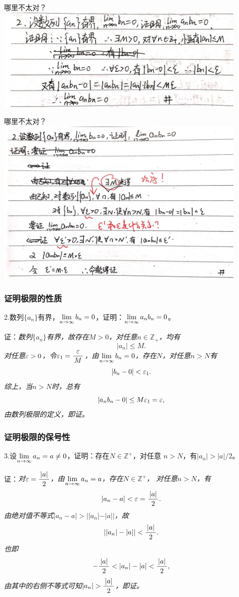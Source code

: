 \begin{frame}{哪里不太对？}
	\centering
	\includegraphics[width=0.9\textwidth]{./images/ch01/HWR/anbn0-3.jpeg}
\end{frame}

\begin{frame}{哪里不太对？}
	\centering
	\includegraphics[width=0.9\textwidth]{./images/ch01/HWR/anbn0-4.jpeg}
\end{frame}

\begin{frame}[t]\frametitle{证明极限的性质}
\large
2.数列$\{a_n\}$有界，$\lim\limits_{n\to\infty} b_n=0$，证明：$\lim\limits_{n\to\infty} a_nb_n=0$。

证：\it 数列$\{a_n\}$有界，故存在$M>0$，对任意$n\in\mathbb{Z}_+$，均有
$$|a_n|\leq M.$$
对任意$\varepsilon>0$，令$\varepsilon_1=\displaystyle\frac{\,{\varepsilon}\,}{\,{M}\,}$，由$\lim\limits_{n\to\infty} b_n=0$，存在$N$，对任意$n>N$有
$$|b_n-0|<\varepsilon_1.$$
综上，当$n>N$时，总有
$$|a_nb_n-0|\leq M\varepsilon_1=\varepsilon,$$
由数列极限的定义，即证。\fin
\end{frame}

\begin{frame}[t]\frametitle{证明极限的保号性}
\large
3.设$\lim\limits_{n\to\infty} a_n=a\ne 0$，证明：存在$N\in\mathbb{Z}^+$，对任意
$n>N$，有$|a_n|>|a|/2$。

证：\it 对$\varepsilon=\displaystyle\frac{\,{|a|}\,}{\,{2}\,}$，由$\lim\limits_{n\to\infty} a_n=a$，存在$N\in\mathbb{Z}^+$，
对任意$n>N$，有
$$|a_n-a|<\varepsilon=\displaystyle\frac{\,{|a|}\,}{\,{2}\,}.$$
由绝对值不等式$|a_n-a|>||a_n|-|a||$，故
$$||a_n|-|a||<\displaystyle\frac{\,{|a|}\,}{\,{2}\,}.$$
也即
$$-\df{|a|}2<|a_n|-|a|<\df{|a|}2,$$
由其中的右侧不等式可知$|a_n|>\df{|a|}2$，即证。\fin
\end{frame}

